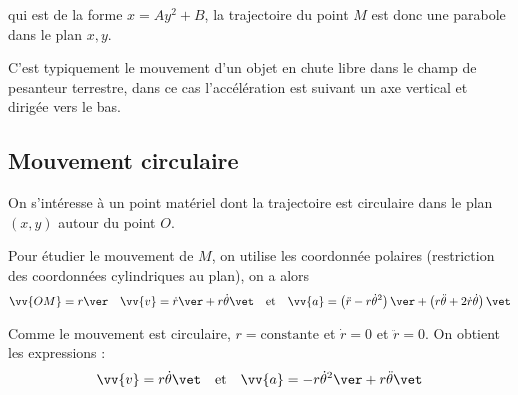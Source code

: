 \documentclass{cours}
\begin{document}
qui est de la forme $x = Ay^2 + B$, la trajectoire du point $M$ est donc une parabole dans le plan $x, y$.  
\begin{center}
\end{center}
C'est typiquement le mouvement d'un objet en chute libre dans le champ de pesanteur terrestre, dans ce cas l'accélération est suivant un axe vertical et dirigée vers le bas.

\subsection{Mouvement circulaire}%
\label{ssub:mouvement_circulaire}
On s'intéresse à un point matériel dont la trajectoire est circulaire dans le plan $(x, y)$ autour du point $O$. 
\begin{center}
\end{center}

Pour étudier le mouvement de $M$, on utilise les coordonnée polaires (restriction des coordonnées cylindriques au plan), on a alors
\begin{equation}
\vv{OM}=r\ver 
\quad 
\vv{v}=\dot{r}\ver+r \dot{\theta}\vet 
\quad \text{et}\quad 
\vv{a}=\left( \ddot{r}-r \dot{\theta}^2 \right) \ver + \left( r \ddot{\theta} +2 \dot{r}\dot{\theta} \right)\vet
\end{equation}
 
Comme le mouvement est circulaire, $r=\text{constante}$ et $\dot{r}=0$ et $\ddot{r}=0$. On obtient les expressions :
\begin{equation}
\vv{v}=r \dot{\theta}\vet 
\quad \text{et} \quad 
\vv{a}=-r \dot{\theta}^2\ver + r \ddot{\theta}\vet
\end{equation}
\end{document}
